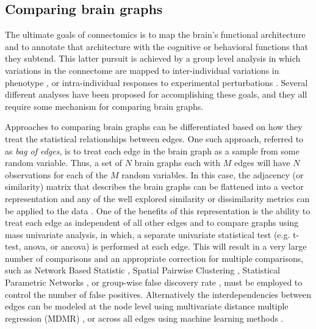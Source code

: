 \subsection{Comparing brain graphs} 

The ultimate goals of connectomics is to map the brain's functional architecture and to annotate that architecture with the cognitive or behavioral functions that they subtend. This latter pursuit is achieved by a group level analysis in which variations in the connectome are mapped to inter-individual variations in phenotype \cite{Kelly2011}, or intra-individual responses to experimental perturbations \cite{Shirer}. Several different analyses have been proposed for accomplishing these goals, and they all require some mechanism for comparing brain graphs. 
 
Approaches to comparing brain graphs can be differentiated based on how they treat the statistical relationships between edges. One such approach, referred to as \emph{bag of edges}, is to treat each edge in the brain graph as a sample from some random variable. Thus, a set of $N$ brain graphs each with $M$ edges will have $N$ observations for each of the $M$ random variables. In this case, the adjacency (or similarity) matrix that describes the brain graphs can be flattened into a vector representation and any of the well explored similarity or dissimilarity metrics can be applied to the data \cite{Richiardi2013}. One of the benefits of this representation is the ability to treat each edge as independent of all other edges and to compare graphs using mass univariate analysis, in which, a separate univariate statistical test (e.g. t-test, anova, or ancova) is performed at each edge. This will result in a very large number of comparisons and an appropriate correction for multiple comparisons, such as Network Based Statistic \cite{Zalesky2011}, Spatial Pairwise Clustering \cite{Zalesky2012}, Statistical Parametric Networks \cite{Ginestet2013}, or group-wise false discovery rate \cite{}, must be employed to control the number of false positives. Alternatively the interdependencies between edges can be modeled at the node level using multivariate distance multiple regression (MDMR) \cite{Shehzad2014}, or across all edges using machine learning methods \cite{Craddock2009, Dosenbach2010, Richiardi2011}. 

